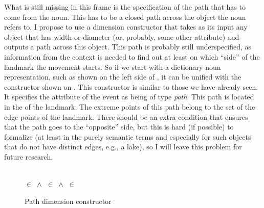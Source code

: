 What is still missing in this frame is the specification of the path that has to come from the noun. This has to be a closed path across the object the noun refers to. I propose to use a dimension constructor that takes as its input any object that has width or diameter (or, probably, some other attribute) and outputs a path across this object. This path is probably still underspecified, as information from the context   is needed to find out at least on which ``side'' of the landmark the movement starts. So if we start with a dictionary noun representation, such as shown on the left side of , it can be unified with the constructor shown on . This constructor is similar to those we have already seen. It specifies the \NOUNDIM attribute of the event as being of type \textit{path}. This path is located in the \LOC of the landmark. The extreme points of this path belong to the set of the edge points of the landmark. There should be an extra condition that ensures that the path goes to the ``opposite'' side, but this is hard (if possible) to formalize (at least in the purely semantic terms and especially for such objects that do not have distinct edges, e.g., a lake), so I will leave this problem for future  research.  

\begin{figure}\small
\begin{minipage}{0.33\textwidth}\centering
{}\end{minipage}\hfill%
\begin{minipage}{0.33\textwidth}\centering
{}\\
 $\in$  $\,\wedge\,$  $\in$  $\,\wedge\,$  $\in$ 
\end{minipage}\hfill%
\begin{minipage}{0.33\textwidth}\centering
\end{minipage}
\caption{Path dimension constructor\label{constructor:path}}
\end{figure}

